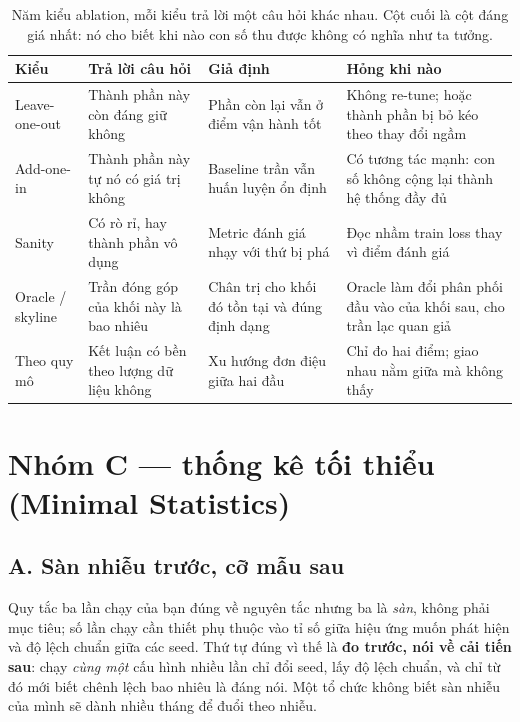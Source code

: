 \documentclass[../../deep_learning.tex]{subfiles}
\begin{document}
\begin{table}[H]\centering\footnotesize
\caption{Năm kiểu ablation, mỗi kiểu trả lời một câu hỏi khác nhau. Cột cuối là cột đáng giá nhất: nó cho biết khi nào con số thu được không có nghĩa như ta tưởng.}
\label{tab:kieu-ablation}
\begin{tabularx}{\linewidth}{@{}L{2.3cm}YL{2.6cm}L{3.4cm}@{}}
\toprule
\textbf{Kiểu} & \textbf{Trả lời câu hỏi} & \textbf{Giả định} & \textbf{Hỏng khi nào}\\
\midrule
Leave-one-out & Thành phần này còn đáng giữ không & Phần còn lại vẫn ở điểm vận hành tốt & Không re-tune; hoặc thành phần bị bỏ kéo theo thay đổi ngầm\\
Add-one-in & Thành phần này tự nó có giá trị không & Baseline trần vẫn huấn luyện ổn định & Có tương tác mạnh: con số không cộng lại thành hệ thống đầy đủ\\
Sanity & Có rò rỉ, hay thành phần vô dụng & Metric đánh giá nhạy với thứ bị phá & Đọc nhầm train loss thay vì điểm đánh giá\\
Oracle / skyline & Trần đóng góp của khối này là bao nhiêu & Chân trị cho khối đó tồn tại và đúng định dạng & Oracle làm đổi phân phối đầu vào của khối sau, cho trần lạc quan giả\\
Theo quy mô & Kết luận có bền theo lượng dữ liệu không & Xu hướng đơn điệu giữa hai đầu & Chỉ đo hai điểm; giao nhau nằm giữa mà không thấy\\
\bottomrule
\end{tabularx}
\end{table}

\section{Nhóm C --- thống kê tối thiểu (Minimal Statistics)}
\subsection{A. Sàn nhiễu trước, cỡ mẫu sau}
Quy tắc ba lần chạy của bạn đúng về nguyên tắc nhưng ba là \emph{sàn}, không phải mục tiêu; số lần chạy cần thiết phụ thuộc vào tỉ số giữa hiệu ứng muốn phát hiện và độ lệch chuẩn giữa các seed. Thứ tự đúng vì thế là \textbf{đo  trước, nói về cải tiến sau}: chạy \emph{cùng một} cấu hình nhiều lần chỉ đổi seed, lấy độ lệch chuẩn, và chỉ từ đó mới biết chênh lệch bao nhiêu là đáng nói. Một tổ chức không biết sàn nhiễu của mình sẽ dành nhiều tháng để đuổi theo nhiễu.
\end{document}

